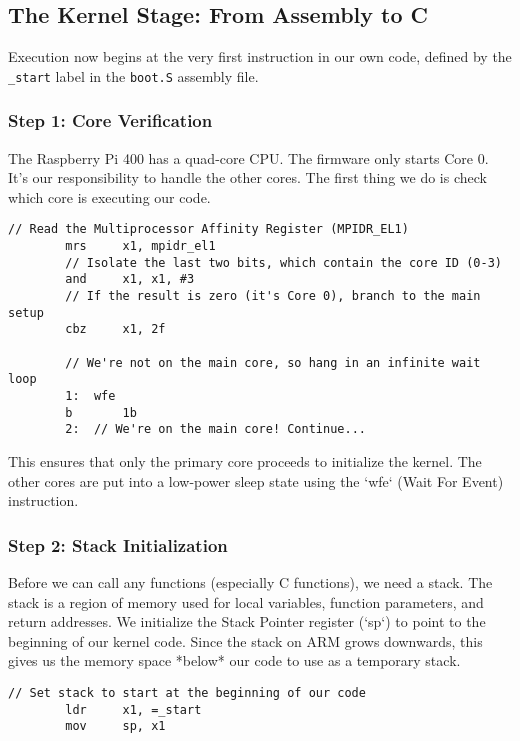 \documentclass[a4paper, 11pt]{article}
\begin{document}
	\subsection{The Kernel Stage: From Assembly to C}
	Execution now begins at the very first instruction in our own code, defined by the \texttt{\_start} label in the \texttt{boot.S} assembly file.
	
	\subsubsection{Step 1: Core Verification}
	The Raspberry Pi 400 has a quad-core CPU. The firmware only starts Core 0. It's our responsibility to handle the other cores. The first thing we do is check which core is executing our code.
	
	\begin{lstlisting}[style=cstyle, language={}, caption={Checking the core ID in \texttt{boot.S}}]
		// Read the Multiprocessor Affinity Register (MPIDR_EL1)
		mrs     x1, mpidr_el1
		// Isolate the last two bits, which contain the core ID (0-3)
		and     x1, x1, #3
		// If the result is zero (it's Core 0), branch to the main setup
		cbz     x1, 2f
		
		// We're not on the main core, so hang in an infinite wait loop
		1:  wfe
		b       1b
		2:  // We're on the main core! Continue...
	\end{lstlisting}
	This ensures that only the primary core proceeds to initialize the kernel. The other cores are put into a low-power sleep state using the `wfe` (Wait For Event) instruction.
	
	\subsubsection{Step 2: Stack Initialization}
	Before we can call any functions (especially C functions), we need a stack. The stack is a region of memory used for local variables, function parameters, and return addresses. We initialize the Stack Pointer register (`sp`) to point to the beginning of our kernel code. Since the stack on ARM grows downwards, this gives us the memory space *below* our code to use as a temporary stack.
	
	\begin{lstlisting}[style=cstyle, language={ }, caption={Setting up the initial stack pointer.}]
		// Set stack to start at the beginning of our code
		ldr     x1, =_start
		mov     sp, x1
	\end{lstlisting}
	
\end{document}
